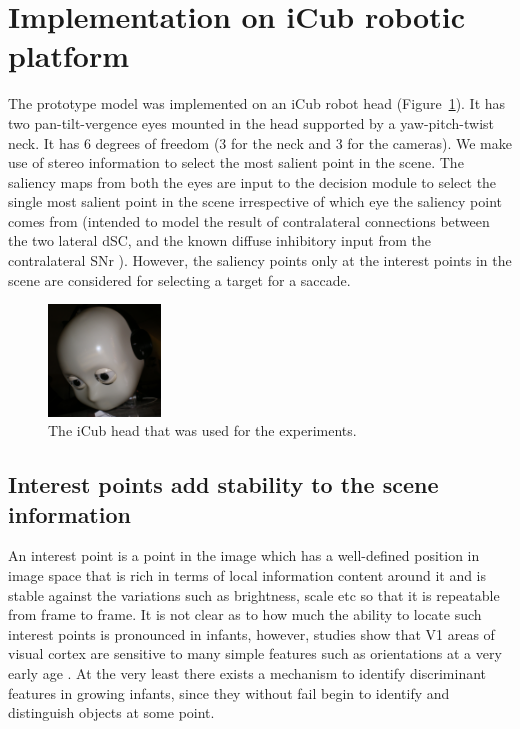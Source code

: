 \documentclass[conference]{IEEEtran}
\begin{document}
\section{Implementation on iCub robotic platform}
The prototype model was implemented on an iCub robot head
(Figure~\ref{fig:icub_head}). It has two pan-tilt-vergence eyes
mounted in the head supported by a yaw-pitch-twist neck. It has 6
degrees of freedom (3 for the neck and 3 for the cameras).  We make
use of stereo information to select the most salient point in the
scene. The saliency maps from both the eyes are input to the decision
module to select the single most salient point in the scene
irrespective of which eye the saliency point comes from (intended to
model the result of contralateral connections between the two lateral
dSC, and the known diffuse inhibitory input from the contralateral SNr
\cite{jiang_etal_2003_SNrSCbilateralcontrol}). However, the saliency
points only at the interest points in the scene are considered for
selecting a target for a saccade.

\begin{figure} [!t]
\centering
\includegraphics[width=3.0cm]{icub_head.jpg}
\caption{The iCub head that was used for the experiments.}
\label{fig:icub_head}
\end{figure}

\subsection{Interest points add stability to the scene information}
An interest point is a point in the image which has a well-defined
position in image space that is rich in terms of local information
content around it and is stable against the variations such as
brightness, scale etc so that it is repeatable from frame to frame. It
is not clear as to how much the ability to locate such interest points
is pronounced in infants, however, studies show that V1 areas of
visual cortex are sensitive to many simple features such as
orientations at a very early age \cite{malsburg1973}. At the very
least there exists a mechanism to identify discriminant features in
growing infants, since they without fail begin to identify and
distinguish objects at some point.
\end{document}
